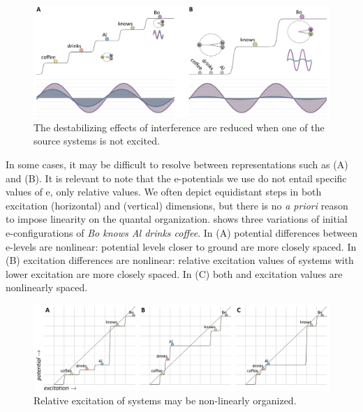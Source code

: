   
\begin{figure}
\includegraphics[width=\textwidth]{figures/Tilsen-img95.png}
\caption{The destabilizing effects of interference are reduced when one of the source systems is not excited.}
\label{fig:4:45}
\end{figure}

   In some cases, it may be difficult to resolve between representations such as (A) and (B). It is relevant to note that the e-potentials we use do not entail specific values of e, only relative values. We often depict equidistant steps in both excitation (horizontal) and  (vertical) dimensions, but there is no {\textit{a priori}} reason to impose linearity on the quantal organization. {} shows three variations of initial e-con\-fig\-u\-ra\-tions of \textit{Bo knows Al drinks coffee}. In (A) potential differences between e-levels are nonlinear: potential levels closer to ground are more closely spaced. In (B) excitation differences are nonlinear: relative excitation values of systems with lower excitation are more closely spaced. In (C) both  and excitation values are nonlinearly spaced.

  
\begin{figure}
\includegraphics[width=\textwidth]{figures/Tilsen-img96.png}
\caption{Relative excitation of systems may be non-linearly organized.}
\label{fig:4:46}
\end{figure}
   

